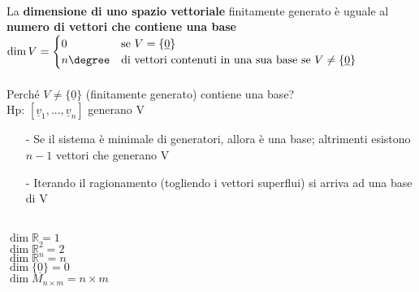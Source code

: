 \begin{proposizione}
	\phantom{}\\
	La \textbf{dimensione di uno spazio vettoriale} finitamente generato è uguale al \textbf{numero di vettori che contiene una base}\\
	$
		\dim V= 
		\begin{cases}
		  0 & \text{se } V=\{\underline{0}\}\\
		  n\degree & \text{di vettori contenuti in una sua base se } V\neq \{\underline{0}\}
		\end{cases}
	$\\\\
	Perché $V\neq\{\underline{0}\}$ (finitamente generato) contiene una base?\\
	Hp: $[\underline{v}_1,...,\underline{v}_n]$ generano V
	\begin{itemize}
		\item[-] Se il sistema è minimale di generatori, allora è una base; altrimenti esistono $n-1$ vettori che generano V
		\item[-] Iterando il ragionamento (togliendo i vettori superflui) si arriva ad una base di V
	\end{itemize}
	\begin{es}
		\phantom{}\\
		$\dim\mathbb{R}=1$\\
		$\dim\mathbb{R}^2=2$\\
		$\dim\mathbb{R}^n=n$\\
		$\dim\{\underline{0}\}=0$\\
		$\dim M_{n\times m}=n\times m$
	\end{es}
\end{proposizione}

